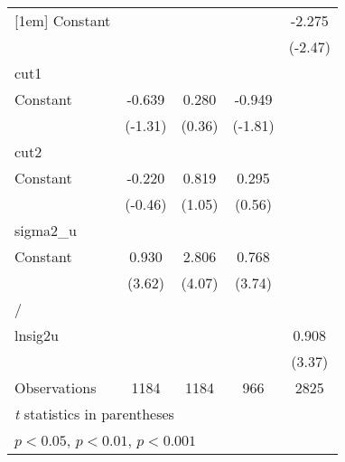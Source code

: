 {\begin{tabular}{l*{4}{c}}
[1em]
Constant            &                     &                     &                     &      -2.275\sym{*}  \\
                    &                     &                     &                     &     (-2.47)         \\
\hline
cut1                &                     &                     &                     &                     \\
Constant            &      -0.639         &       0.280         &      -0.949         &                     \\
                    &     (-1.31)         &      (0.36)         &     (-1.81)         &                     \\
\hline
cut2                &                     &                     &                     &                     \\
Constant            &      -0.220         &       0.819         &       0.295         &                     \\
                    &     (-0.46)         &      (1.05)         &      (0.56)         &                     \\
\hline
sigma2\_u            &                     &                     &                     &                     \\
Constant            &       0.930\sym{***}&       2.806\sym{***}&       0.768\sym{***}&                     \\
                    &      (3.62)         &      (4.07)         &      (3.74)         &                     \\
\hline
/                   &                     &                     &                     &                     \\
lnsig2u             &                     &                     &                     &       0.908\sym{***}\\
                    &                     &                     &                     &      (3.37)         \\
\hline
Observations        &        1184         &        1184         &         966         &        2825         \\
\hline\hline
\multicolumn{5}{l}{\footnotesize \textit{t} statistics in parentheses}\\
\multicolumn{5}{l}{\footnotesize \sym{*} \(p<0.05\), \sym{**} \(p<0.01\), \sym{***} \(p<0.001\)}\\
\end{tabular}
}
